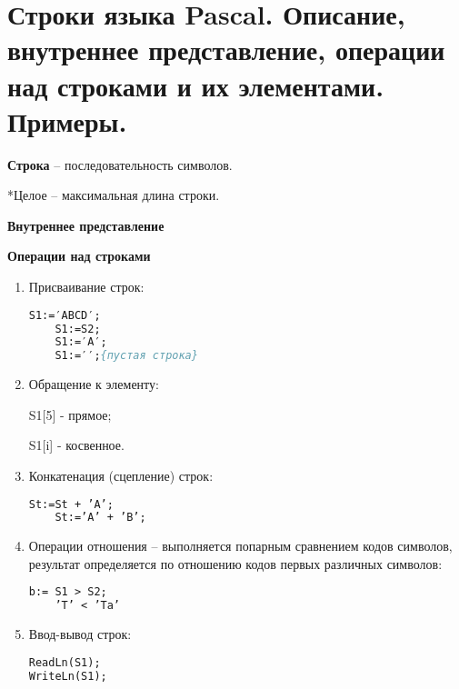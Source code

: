 



\newpage\section{Строки языка Pascal. Описание, внутреннее представление, операции над строками и их 
элементами. Примеры. }

\begin{myquote}
            
\end{myquote}

{\bf{Строка}} – последовательность символов.


*Целое – максимальная длина строки.

{\bf{Внутреннее представление}}

{\bf{Операции над строками}}
\begin{enumerate}
\item Присваивание строк:

\begin{lstlisting}[language=Pascal]
 	S1:=′ABCD′;
	S1:=S2;
	S1:=′A′;
	S1:=′′;{пустая строка}
\end{lstlisting}
    
\item Обращение к элементу:

	S1[5] - прямое;

	S1[i] - косвенное.

\item Конкатенация (сцепление) строк:

\begin{lstlisting}[language=Pascal]
	St:=St + ’A’;
	St:=’A’ + ’B’;
\end{lstlisting}

\item Операции отношения – выполняется попарным сравнением кодов символов, результат определяется по отношению кодов первых различных символов:

\begin{lstlisting}[language=Pascal]
	b:= S1 > S2;
	’T’ < ’Ta’
\end{lstlisting}

\item Ввод-вывод строк:

\begin{lstlisting}[language=Pascal]
ReadLn(S1);
WriteLn(S1);
\end{lstlisting}

\end{enumerate}

